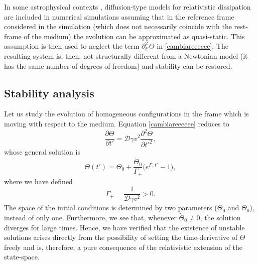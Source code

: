 \documentclass[a4paper, amsfonts, amssymb, amsmath, reprint, showkeys, nofootinbib, twoside]{revtex4-1}
\begin{document}
In some astrophysical contexts \citep{FragileKlusniak2018}, diffusion-type models for relativistic dissipation are included in numerical simulations assuming that in the reference frame considered in the simulation (which does not necessarily coincide with the rest-frame of the medium) the evolution can be approximated as quasi-static. This assumption is then used to neglect the term $\partial_{t'}^2 \Theta$ in \eqref{cambiareeeeee}. The resulting system is, then, not structurally different from a Newtonian model (it has the same number of degrees of freedom) and stability can be restored.



\subsection{Stability analysis}

Let us study the evolution of homogeneous configurations in the frame which is moving with respect to the medium. Equation \eqref{cambiareeeeee} reduces to
\begin{equation}\label{adessoesplode}
\dfrac{\partial \Theta}{\partial t'}  =\mathcal{D} \gamma  v^2 \dfrac{\partial^2 \Theta}{\partial {t'}^2},
\end{equation}
whose general solution is
\begin{equation}
\Theta (t') = \Theta_0 + \dfrac{\dot{\Theta}_0}{\Gamma_+} \big(e^{\Gamma_+ t'}-1 \big) ,
\end{equation}
where we have defined
\begin{equation}
\Gamma_+ = \dfrac{1}{\mathcal{D} \gamma  v^2} >0.
\end{equation}
The space of the initial conditions is determined by two parameters ($\Theta_0$ and $\dot{\Theta}_0$), instead of only one. Furthermore, we see that, whenever $\dot{\Theta}_0 \neq 0$, the solution diverges for large times. Hence, we have verified that the existence of unstable solutions arises directly from the possibility of setting the time-derivative of $\Theta$ freely and is, therefore, a pure consequence of the relativistic extension of the state-space.
\end{document}
